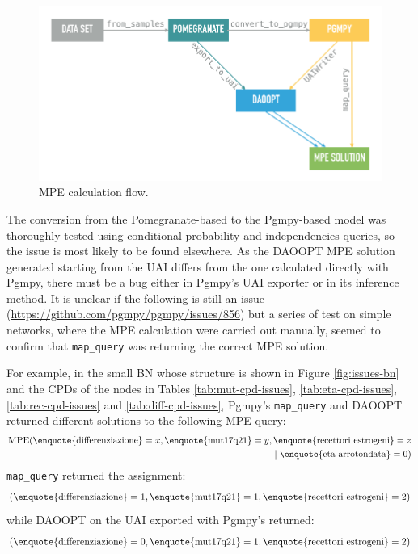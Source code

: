 \begin{figure}[htbp]
\centerline{\includegraphics[width=\textwidth]{results/images/mpe_conversion_process}}
\caption{MPE calculation flow.}
\label{fig:mpe_conversion_process}
\end{figure}

The conversion from the Pomegranate-based to the Pgmpy-based model was thoroughly tested using conditional probability and independencies queries, so the issue is most likely to be found elsewhere.
As the DAOOPT MPE solution generated starting from the UAI differs from the one calculated directly with Pgmpy, there must be a bug either in Pgmpy's UAI exporter or in its inference method.
It is unclear if the following is still an issue (\url{https://github.com/pgmpy/pgmpy/issues/856}) but a series of test on simple networks, where the MPE calculation were carried out manually, seemed to confirm that \texttt{map\_query} was returning the correct MPE solution.

For example, in the small BN whose structure is shown in Figure \ref{fig:issues-bn} and the CPDs of the nodes in Tables \ref{tab:mut-cpd-issues}, \ref{tab:eta-cpd-issues}, \ref{tab:rec-cpd-issues} and \ref{tab:diff-cpd-issues}, Pgmpy's \texttt{map\_query} and DAOOPT returned different solutions to the following MPE query:
\begin{align}
\begin{split}
	\text{MPE}( \text{\enquote{differenziazione}}=x, \text{\enquote{mut17q21}}=y, \text{\enquote{recettori estrogeni}}=z \\
	\mid \text{\enquote{eta arrotondata}}=0 )
\end{split} 
\end{align}
\texttt{map\_query} returned the assignment: 
\begin{align} \label{eq:pgmpy-assignment}
  (\text{\enquote{differenziazione}}=1, 
  \text{\enquote{mut17q21}}=1, 
  \text{\enquote{recettori estrogeni}}=2)
\end{align}
while DAOOPT on the UAI exported with Pgmpy's returned:
\begin{align} \label{eq:daoopt-assignment}
  (\text{\enquote{differenziazione}}=0, 
  \text{\enquote{mut17q21}}=1, 
  \text{\enquote{recettori estrogeni}}=2)
\end{align}

